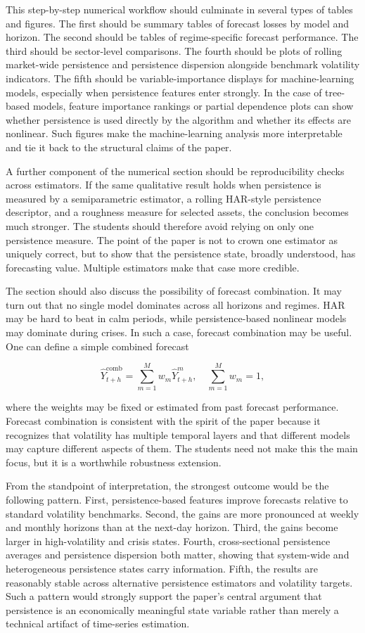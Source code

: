 \documentclass[12pt]{article}
\begin{document}
This step-by-step numerical workflow should culminate in several types of tables and figures. The first should be summary tables of forecast losses by model and horizon. The second should be tables of regime-specific forecast performance. The third should be sector-level comparisons. The fourth should be plots of rolling market-wide persistence and persistence dispersion alongside benchmark volatility indicators. The fifth should be variable-importance displays for machine-learning models, especially when persistence features enter strongly. In the case of tree-based models, feature importance rankings or partial dependence plots can show whether persistence is used directly by the algorithm and whether its effects are nonlinear. Such figures make the machine-learning analysis more interpretable and tie it back to the structural claims of the paper.

A further component of the numerical section should be reproducibility checks across estimators. If the same qualitative result holds when persistence is measured by a semiparametric estimator, a rolling HAR-style persistence descriptor, and a roughness measure for selected assets, the conclusion becomes much stronger. The students should therefore avoid relying on only one persistence measure. The point of the paper is not to crown one estimator as uniquely correct, but to show that the persistence state, broadly understood, has forecasting value. Multiple estimators make that case more credible.

The section should also discuss the possibility of forecast combination. It may turn out that no single model dominates across all horizons and regimes. HAR may be hard to beat in calm periods, while persistence-based nonlinear models may dominate during crises. In such a case, forecast combination may be useful. One can define a simple combined forecast

\[\hat{Y}_{t+h}^{\mathrm{comb}} = \sum_{m=1}^{M} w_m \hat{Y}_{t+h}^m, \quad \sum_{m=1}^{M} w_m = 1,\]

where the weights may be fixed or estimated from past forecast performance. Forecast combination is consistent with the spirit of the paper because it recognizes that volatility has multiple temporal layers and that different models may capture different aspects of them. The students need not make this the main focus, but it is a worthwhile robustness extension.

From the standpoint of interpretation, the strongest outcome would be the following pattern. First, persistence-based features improve forecasts relative to standard volatility benchmarks. Second, the gains are more pronounced at weekly and monthly horizons than at the next-day horizon. Third, the gains become larger in high-volatility and crisis states. Fourth, cross-sectional persistence averages and persistence dispersion both matter, showing that system-wide and heterogeneous persistence states carry information. Fifth, the results are reasonably stable across alternative persistence estimators and volatility targets. Such a pattern would strongly support the paper's central argument that persistence is an economically meaningful state variable rather than merely a technical artifact of time-series estimation.
\end{document}
